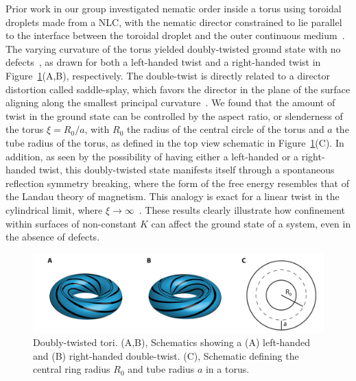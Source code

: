 Prior work in our group investigated nematic order inside a torus using toroidal droplets made from a NLC, with the nematic director constrained to lie parallel to the interface between the toroidal droplet and the outer continuous medium~\cite{RN24,RN47}.
The varying curvature of the torus yielded doubly-twisted ground state with no defects~\cite{RN24}, as drawn for both a left-handed twist and a right-handed twist in Figure~\ref{f:1-Torus}(A,B), respectively.
The double-twist is directly related to a director distortion called saddle-splay, which favors the director in the plane of the surface aligning along the smallest principal curvature~\cite{RN59}.
We found that the amount of twist in the ground state can be controlled by the aspect ratio, or slenderness of the torus $\xi = R_0/a$, with $R_0$ the radius of the central circle of the torus and $a$ the tube radius of the torus, as defined in the top view schematic in Figure~\ref{f:1-Torus}(C).
In addition, as seen by the possibility of having either a left-handed or a right-handed twist, this doubly-twisted state manifests itself through a spontaneous reflection symmetry breaking, where the form of the free energy resembles that of the Landau theory of magnetism.
This analogy is exact for a linear twist in the cylindrical limit, where $\xi \rightarrow \infty$~\cite{RN293}.
These results clearly illustrate how confinement within surfaces of non-constant $K$ can affect the ground state of a system, even in the absence of defects.
\begin{figure}
  \centering
  \includegraphics{figures/C1/Ch1-Figs_Torus.png}
  \caption{Doubly-twisted tori.
  (A,B), Schematics showing a (A) left-handed and (B) right-handed double-twist.
  (C), Schematic defining the central ring radius $R_0$ and tube radius $a$ in a torus.}\label{f:1-Torus}
\end{figure}

